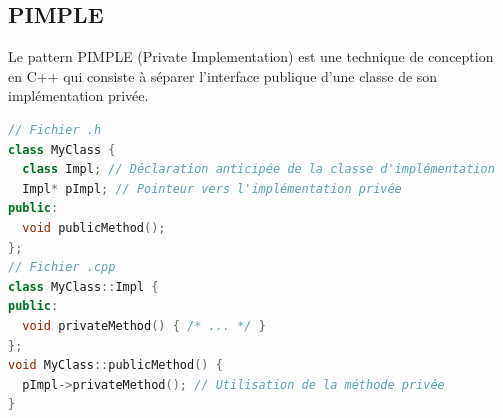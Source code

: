 \documentclass{article}
\begin{document}
\begin{multicols*}{3}
\section*{PIMPLE}
Le pattern PIMPLE (Private Implementation) est une technique de conception en C++ qui consiste à séparer l'interface publique d'une classe de son implémentation privée.

\begin{lstlisting}[language=C++]
// Fichier .h
class MyClass {
  class Impl; // Déclaration anticipée de la classe d'implémentation
  Impl* pImpl; // Pointeur vers l'implémentation privée
public:
  void publicMethod();
};
// Fichier .cpp
class MyClass::Impl {
public:
  void privateMethod() { /* ... */ }
};
void MyClass::publicMethod() {
  pImpl->privateMethod(); // Utilisation de la méthode privée
}
\end{lstlisting}



\end{multicols*}
\end{document}
